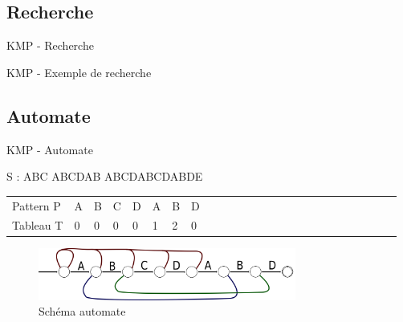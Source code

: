 \documentclass[12pt]{beamer}
\begin{document}
\subsection{Recherche}
\begin{frame}{KMP - Recherche}

\end{frame}
\begin{frame}{KMP - Exemple de recherche}

\end{frame}

\subsection{Automate}
\begin{frame}{KMP - Automate}
\begin{center}

S : ABC ABCDAB ABCDABCDABDE \\
\end{center}

\begin{center}
\begin{tabular}{ l || p{0.01cm}p{0.01cm}p{0.01cm}p{0.01cm}p{0.01cm}p{0.01cm}p{0.01cm}p{0.01cm}p{0.01cm}p{0.01cm}p{0.01cm}p{0.01cm}p{0.01cm}p{0.01cm}p{0.01cm}p{0.01cm}p{0.01cm}p{0.01cm}p{0.01cm}p{0.01cm}p{0.01cm}p{0.01cm}p{0.01cm}p{0.01cm}} 
   Pattern P &A&B&C&D&A&B&D \\
   Tableau T &0&0&0&0&1&2&0 \\
\end{tabular}
\end{center}
\begin{figure}
	\centering
    \includegraphics[width=320px]{Schema/Automate.png}
	\caption{Schéma automate}
\end{figure}
\end{frame}
\end{document}
